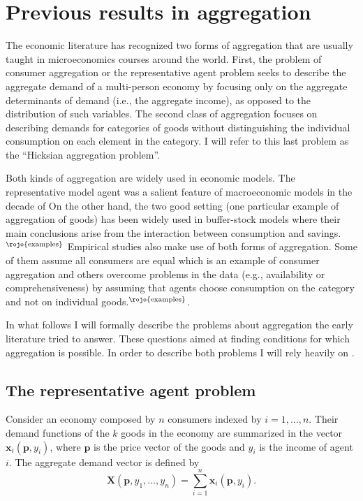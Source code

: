 \documentclass[english, a4paper,12pt]{article}
\begin{document}
\section{Previous results in aggregation} \label{sec:PrevResults}
The economic literature has recognized two forms of aggregation that are usually taught in microeconomics courses around the world. First, the problem of consumer aggregation or the representative agent problem seeks to describe the aggregate demand of a multi-person economy by focusing only on the aggregate determinants of demand (i.e., the aggregate income), as opposed to the distribution of such variables. The second class of aggregation focuses on describing demands for categories of goods without distinguishing the individual consumption on each element in the category. I will refer to this last problem as the ``Hicksian aggregation problem''.

Both kinds of aggregation are widely used in economic models. The representative model agent was a salient feature of macroeconomic models in the decade of  On the other hand, the two good setting (one particular example of aggregation of goods) has been widely used in buffer-stock models where their main conclusions arise from the interaction between consumption and savings.$^{\text{\rojo{examples}}}$ Empirical studies also make use of both forms of aggregation. Some of them assume all consumers are equal which is an example of consumer aggregation and others overcome problems in the data (e.g., availability or comprehensiveness) by assuming that agents choose consumption on the category and not on individual goods.$^{\text{\rojo{examples}}}$.

In what follows I will formally describe the problems about aggregation the early literature tried to answer. These questions aimed at finding conditions for which aggregation is possible. In order to describe both problems I will rely heavily on \cite{VarianBook}.

\subsection{The representative agent problem} \label{ssec:RepAgent}
Consider an economy composed by $n$ consumers indexed by $i = 1, \ldots, n$. Their demand functions of the $k$ goods in the economy are summarized in the vector $\mathbf{x}_{i}(\mathbf{p}, y_{i})$, where $\mathbf{p}$ is the price vector of the goods and $y_{i}$ is the income of agent $i$. The aggregate demand vector is defined by
	\begin{equation} \label{eq:aggdemand1}
		\mathbf{X}(\mathbf{p}, y_{1}, \ldots, y_{n}) = \sum_{i=1}^{n} \mathbf{x}_{i}(\mathbf{p},y_{i}).
	\end{equation}
\end{document}
